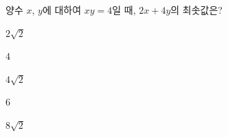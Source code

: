 양수 $x$, $y$에 대하여 $xy=4$일 때, $2x+4y$의 최솟값은?
\begin{choices32}{\rule[-3ex]{0pt}{8ex}$2\sqrt{2}$}{\rule[-3ex]{0pt}{8ex}$4$}{\rule[-3ex]{0pt}{8ex}$4\sqrt{2}$}{\rule[-3ex]{0pt}{8ex}$6$}{\rule[-3ex]{0pt}{8ex}$8\sqrt{2}$}\end{choices32}
